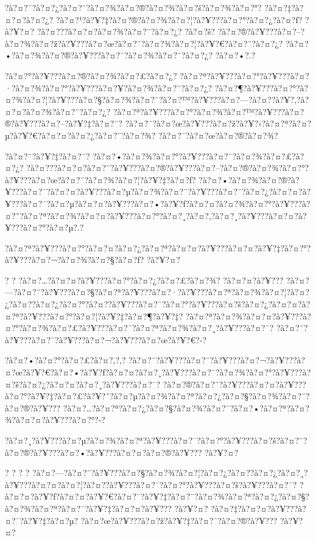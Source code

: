 \documentclass[11pt, openany]{book}
\begin{document}
{{{{{{{{{{{{{{{{{?à?¤?¯?à?¤?¿?à?¤?¨?à?¤?¾?à?¤?®?à?¤?¾?à?¤?š?à?¤?¾?à?¤?°?
?à?¤?‡?à?¤?¤?à?¤?¿?
?à?¤?¹?à?¥?‡?à?¤?®?à?¤?¾?à?¤?¦?à?¥???à?¤?°?à?¤?¿?à?¤?ƒ? ?à?¥?¤?
?à?¤???à?¤?¤?à?¤?¾?à?¤?¨?à?¤?¿? ?à?¤?š?
?à?¤?®?à?¥???à?¤?--?à?¤?¾?à?¤?ž?à?¥???à?¤?œ?à?¤?¨?à?¤?¾?à?¤?¦?à?¥?€?à?¤?¨?à?¤?¿?
?à?¤?•?à?¤?¾?à?¤?®?à?¥???à?¤?¯?à?¤?¾?à?¤?¨?à?¤?¿? ?à?¤?•?.?

?à?¤?°?à?¥???à?¤?®?à?¤?¾?à?¤?£?à?¤?¿?
?à?¤?ª?à?¥???à?¤?°?à?¥???à?¤?·?à?¤?¾?à?¤?°?à?¥???à?¤?¥?à?¤?¾?à?¤?¨?à?¤?¿?
?à?¤?¶?à?¥???à?¤?°?à?¤?¾?à?¤?¦?à?¥???à?¤?§?à?¤?¾?à?¤?¨?à?¤?™?à?¥???à?¤?---?à?¤?­?à?¥?‚?à?¤?¤?à?¤?¾?à?¤?¨?à?¤?¿?
?à?¤?ª?à?¥???à?¤?°?à?¤?¾?à?¤?™?à?¥???à?¤?®?à?¥???à?¤?--?à?¥?‡?à?¤?¨?
?à?¤?¯?à?¤?œ?à?¥???à?¤?ž?à?¥?‹?à?¤?ª?à?¤?µ?à?¥?€?à?¤?¤?à?¤?¿?à?¤?¨?à?¤?¾?
?à?¤?¯?à?¤?œ?à?¤?®?à?¤?¾?

?à?¤?¨?à?¥?‡?à?¤?¨? ?à?¤?•?à?¤?¾?à?¤?°?à?¥???à?¤?¯?à?¤?¾?à?¤?£?à?¤?¿?
?à?¤???à?¤?¤?à?¤?¨?à?¥???à?¤?®?à?¥???à?¤?--?à?¤?®?à?¤?¾?à?¤?°?à?¥???à?¤?œ?à?¤?¨?à?¤?¾?à?¤?¦?à?¥?‡?à?¤?ƒ?
?à?¤?•?à?¤?¾?à?¤?®?à?¥???à?¤?¯?à?¤?¤?à?¥???à?¤?µ?à?¤?¾?à?¤?¨?à?¥???à?¤?¨?à?¤?¿?à?¤?¤?à?¥???à?¤?¯?à?¤?µ?à?¤?¤?à?¥???à?¤?•?à?¥?ƒ?à?¤?¤?à?¤?¾?à?¤?°?à?¥???à?¤?˜?à?¤?ª?à?¤?¾?à?¤?¤?à?¥???à?¤?°?à?¤?¸?à?¤?‚?à?¤?¸?à?¥???à?¤?¤?à?¥???à?¤?°?à?¤?µ?.?

?à?¤?ª?à?¥???à?¤?°?à?¤?¤?à?¤?¿?à?¤?ª?à?¤?¤?à?¥???à?¤?¤?à?¥?‡?à?¤?°?à?¥???à?¤?¬?à?¤?¾?à?¤?§?à?¤?ƒ?
?à?¥?¤?

? ? ?à?¤?\ldots{}?à?¤?¤?à?¥???à?¤?°?à?¤?¿?à?¤?£?à?¤?¾? ?à?¤?¤?à?¥???
?à?¤?---?à?¤?¨?à?¥???à?¤?§?à?¤?ª?à?¥???à?¤?·?à?¥???à?¤?ª?à?¤?¾?à?¤?¦?à?¤?¿?à?¤?­?à?¤?¿?à?¤?°?à?¤?­?à?¥???à?¤?¯?à?¤?°?à?¥???à?¤?š?à?¤?¿?à?¤?¤?à?¤?ª?à?¥???à?¤?°?à?¤?¦?à?¥?‡?à?¤?¶?à?¥?‡?
?à?¤?ª?à?¤?¾?à?¤?¤?à?¥???à?¤?°?à?¤?¾?à?¤?£?à?¥???à?¤?¯?à?¤?ª?à?¤?¾?à?¤?¸?à?¥???à?¤?¯?
?à?¤?¨?à?¥???à?¤?¯?à?¥???à?¤?¬?à?¥???à?¤?œ?à?¥?€?-?

?à?¤?•?à?¤?°?à?¤?£?à?¤?‚?,?
?à?¤?¨?à?¥???à?¤?¯?à?¥???à?¤?¬?à?¥???à?¤?œ?à?¥?€?à?¤?•?à?¥?ƒ?à?¤?¤?à?¤?¸?à?¥???à?¤?¯?à?¤?¾?à?¤?°?à?¥???à?¤?š?à?¤?¿?à?¤?¤?à?¤?¸?à?¥???à?¤?¯?
?à?¤?®?à?¤?¨?à?¥???à?¤?¤?à?¥???à?¤?°?à?¥?‡?à?¤?£?à?¥?ˆ?à?¤?µ?à?¤?¾?à?¤?ª?à?¤?¿?à?¤?§?à?¤?¾?à?¤?¨?à?¤?®?à?¥???
?à?¤?\ldots{}?à?¤?ª?à?¤?¿?à?¤?§?à?¤?¾?à?¤?¯?à?¤?•?à?¤?ª?à?¤?¾?à?¤?¤?à?¥???à?¤?°?-?

?à?¤?¸?à?¥???à?¤?µ?à?¤?¾?à?¤?ª?à?¥???à?¤?¯?à?¤?°?à?¥???à?¤?š?à?¤?¨?à?¤?®?à?¥???à?¤?•?à?¥???à?¤?¤?à?¤?®?à?¥???
?à?¥?¤?

? ? ? ?
?à?¤?---?à?¤?¨?à?¥???à?¤?§?à?¤?¾?à?¤?¦?à?¤?¿?à?¤?­?à?¤?¿?à?¤?¸?à?¥???à?¤?¤?à?¤?¦?à?¤?­?à?¥???à?¤?¯?à?¤?°?à?¥???à?¤?š?à?¥???à?¤?¯?
?à?¤?¤?à?¥?ƒ?à?¤?¤?à?¥?€?à?¤?¯?à?¥?‡?à?¤?¨?à?¤?¾?à?¤?ª?à?¤?¿?à?¤?§?à?¤?¾?à?¤?ª?à?¤?¯?à?¥?‡?à?¤?¤?à?¥???
?à?¥?¤? ?à?¤?‡?à?¤?¤?à?¥???à?¤?¯?à?¥?‡?à?¤?µ?
?à?¤?œ?à?¥???à?¤?ž?à?¥?‡?à?¤?¯?à?¤?®?à?¥??? ?à?¥?¤?

}}}}}}}}}}}}}}}}}
\end{document}
